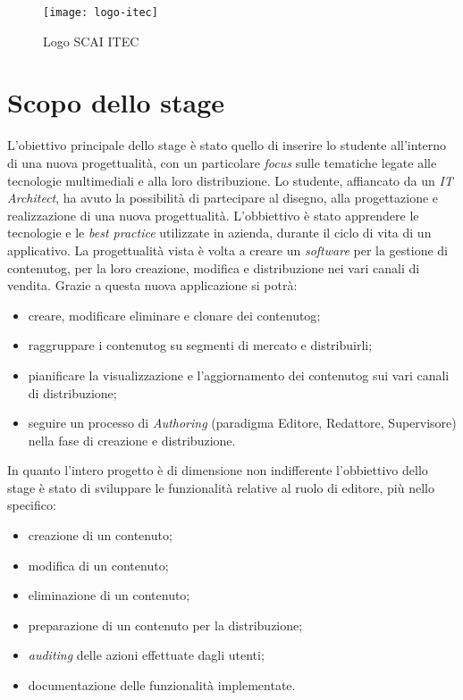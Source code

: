 \begin{figure}[h]
    \begin{center}
    \texttt{[image: logo-itec]}
    \caption{Logo SCAI ITEC}
    \label{fig:figure1}
    \end{center}
\end{figure}


\section{Scopo dello stage}
\label{sez:scopo}
L'obiettivo principale dello stage è stato quello di inserire lo studente all'interno di una nuova progettualità, con un particolare \textit{focus} sulle tematiche legate alle tecnologie multimediali e alla loro distribuzione. Lo studente, affiancato da un \textit{IT Architect}, ha avuto la possibilità di partecipare al disegno, alla progettazione e realizzazione di una nuova progettualità. L'obbiettivo è stato apprendere le tecnologie e le \textit{best practice} utilizzate in azienda, durante il ciclo di vita di un applicativo.
La progettualità vista è volta a creare un \textit{software} per la gestione di \gls{contenutog}\glsfirstoccur{}, per la loro creazione, modifica e distribuzione nei vari canali di vendita.
Grazie a questa nuova applicazione si potrà:
\begin{itemize}
    \item creare, modificare eliminare e clonare dei \gls{contenutog};
    \item raggruppare i \gls{contenutog} su segmenti di mercato e distribuirli;
    \item pianificare la visualizzazione e l’aggiornamento dei \gls{contenutog} sui vari canali di distribuzione;
    \item seguire un processo di \textit{Authoring} (paradigma Editore, Redattore, Supervisore) nella fase di creazione e distribuzione.
\end{itemize} 
In quanto l'intero progetto è di dimensione non indifferente l'obbiettivo dello stage è stato di sviluppare le funzionalità relative al ruolo di editore, più nello specifico:
\begin{itemize}
    \item creazione di un contenuto;
    \item modifica di un contenuto;
    \item eliminazione di un contenuto;
    \item preparazione di un contenuto per la distribuzione;
    \item \textit{auditing} delle azioni effettuate dagli utenti;
    \item documentazione delle funzionalità implementate.
\end{itemize}

